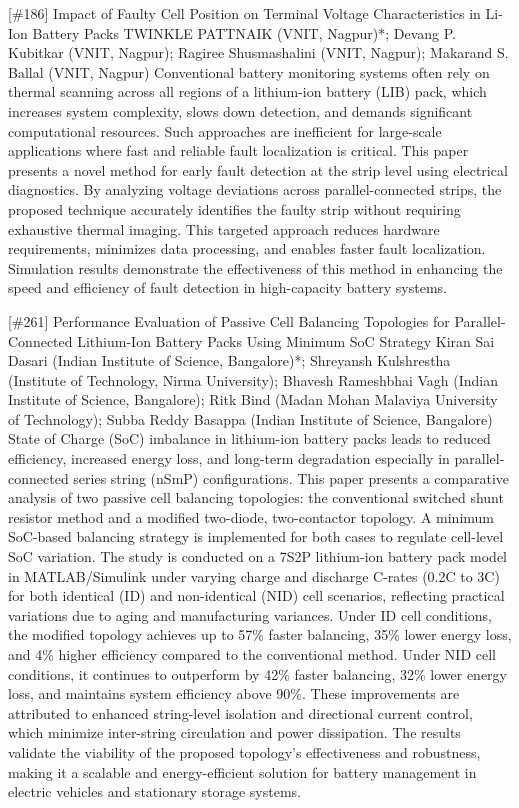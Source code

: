 {} \begin{abstract_online} {[\#186] Impact of Faulty Cell Position on Terminal Voltage Characteristics in Li-Ion Battery Packs} {} {TWINKLE  PATTNAIK (VNIT, Nagpur)*; Devang P. Kubitkar (VNIT, Nagpur); Ragiree Shusmashalini (VNIT, Nagpur); Makarand S. Ballal (VNIT, Nagpur)} {} Conventional battery monitoring systems often rely on thermal scanning across all regions of a lithium-ion battery (LIB) pack, which increases system complexity, slows down detection, and demands significant computational resources. Such approaches are inefficient for large-scale applications where fast and reliable fault localization is critical. This paper presents a novel method for early fault detection at the strip level using electrical diagnostics. By analyzing voltage deviations across parallel-connected strips, the proposed technique accurately identifies the faulty strip without requiring exhaustive thermal imaging. This targeted approach reduces hardware requirements, minimizes data processing, and enables faster fault localization. Simulation results demonstrate the effectiveness of this method in enhancing the speed and efficiency of fault detection in high-capacity battery systems. \end{abstract_online} 
{} \begin{abstract_online} {[\#261] Performance Evaluation of Passive Cell Balancing Topologies for Parallel-Connected Lithium-Ion Battery Packs Using Minimum SoC Strategy } {} {Kiran Sai Dasari (Indian Institute of Science, Bangalore)*; Shreyansh  Kulshrestha (Institute of Technology, Nirma University); Bhavesh Rameshbhai Vagh  (Indian Institute of Science, Bangalore); Ritk  Bind  (Madan Mohan Malaviya University of Technology); Subba Reddy Basappa (Indian Institute of Science, Bangalore)} {} State of Charge (SoC) imbalance in lithium-ion battery packs leads to reduced efficiency, increased energy loss, and long-term degradation especially in parallel-connected series string (nSmP) configurations. This paper presents a comparative analysis of two passive cell balancing topologies: the conventional switched shunt resistor method and a modified two-diode, two-contactor topology. A minimum SoC-based balancing strategy is implemented for both cases to regulate cell-level SoC variation. The study is conducted on a 7S2P lithium-ion battery pack model in MATLAB/Simulink under varying charge and discharge C-rates (0.2C to 3C) for both identical (ID) and non-identical (NID) cell scenarios, reflecting practical variations due to aging and manufacturing variances. Under ID cell conditions, the modified topology achieves up to 57\% faster balancing, 35\% lower energy loss, and 4\% higher efficiency compared to the conventional method. Under NID cell conditions, it continues to outperform by 42\% faster balancing, 32\% lower energy loss, and maintains system efficiency above 90\%. These improvements are attributed to enhanced string-level isolation and directional current control, which minimize inter-string circulation and power dissipation. The results validate the viability of the proposed topology's effectiveness and robustness, making it a scalable and energy-efficient solution for battery management in electric vehicles and stationary storage systems. \end{abstract_online} 
